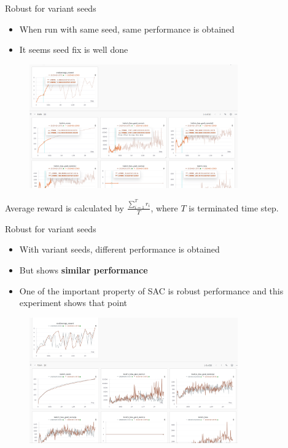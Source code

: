 \documentclass[8pt]{beamer}
\newcommand{\tb}[1]{\textbf{#1}}
\begin{document}
\begin{frame}{Robust for variant seeds}
    \begin{itemize}
        \item When run with same seed, same performance is obtained
        \item It seems seed fix is well done
    \end{itemize}
    \begin{figure}
        \centering
        \includegraphics[width=0.8\textwidth]{fig1.png}
    \end{figure}

    Average reward is calculated by
    $\frac{\sum_{i=1}^T r_i}{T}$, where $T$ is terminated time step.
\end{frame}

\begin{frame}{Robust for variant seeds}
    \begin{itemize}
        \item With variant seeds, different performance is obtained
        \item But shows \tb{similar performance}
        \item One of the important property of SAC is robust performance and this experiment shows that point
    \end{itemize}

    \begin{figure}
        \centering
        \includegraphics[width=0.8\textwidth]{fig2.png}
    \end{figure}
\end{frame}
\end{document}
